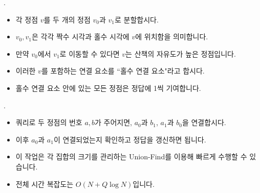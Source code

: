 \begin{frame}{\probno{}. \probtitle{}}
    \begin{itemize}
        \item 각 정점 $v$를 두 개의 정점 $v_0$과 $v_1$로 분할합시다.
        \item $v_0, v_1$은 각각 짝수 시각과 홀수 시각에 $v$에 위치함을 의미합니다.
        \item 만약 $v_0$에서 $v_1$로 이동할 수 있다면 $v$는 산책의 자유도가 높은 정점입니다.
        \item 이러한 $v$를 포함하는 연결 요소를 ``홀수 연결 요소"라고 합시다.
        \item 홀수 연결 요소 안에 있는 모든 정점은 정답에 1씩 기여합니다.
    \end{itemize}
\end{frame}

\begin{frame}{\probno{}. \probtitle{}}
    \begin{itemize}
        \item 쿼리로 두 정점의 번호 $a, b$가 주어지면, $a_0$과 $b_1$, $a_1$과 $b_0$을 연결합시다.
        \item 이후 $a_0$과 $a_1$이 연결되었는지 확인하고 정답을 갱신하면 됩니다.
        \item 이 작업은 각 집합의 크기를 관리하는 Union-Find를 이용해 빠르게 수행할 수 있습니다.
        \item 전체 시간 복잡도는 $O(N + Q \log N)$입니다.
    \end{itemize}
\end{frame}
